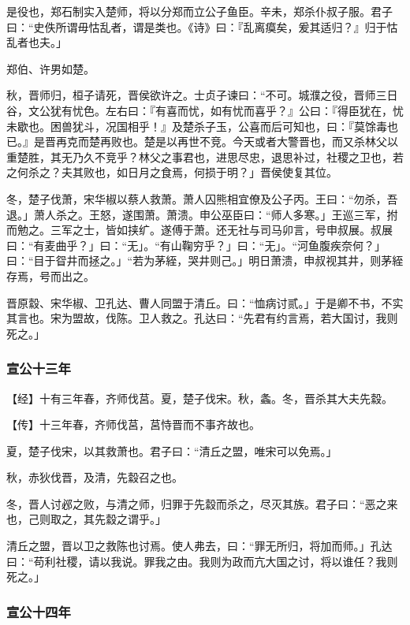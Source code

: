 \documentclass[]{article}
\begin{document}
是役也，郑石制实入楚师，将以分郑而立公子鱼臣。辛未，郑杀仆叔子服。君子曰：``史佚所谓毋怙乱者，谓是类也。《诗》曰：『乱离瘼矣，爰其适归？』归于怙乱者也夫。」

郑伯、许男如楚。

秋，晋师归，桓子请死，晋侯欲许之。士贞子谏曰：``不可。城濮之役，晋师三日谷，文公犹有忧色。左右曰：『有喜而忧，如有忧而喜乎？』公曰：『得臣犹在，忧未歇也。困兽犹斗，况国相乎！』及楚杀子玉，公喜而后可知也，曰：『莫馀毒也已。』是晋再克而楚再败也。楚是以再世不竞。今天或者大警晋也，而又杀林父以重楚胜，其无乃久不竞乎？林父之事君也，进思尽忠，退思补过，社稷之卫也，若之何杀之？夫其败也，如日月之食焉，何损于明？」晋侯使复其位。

冬，楚子伐萧，宋华椒以蔡人救萧。萧人囚熊相宜僚及公子丙。王曰：``勿杀，吾退。」萧人杀之。王怒，遂围萧。萧溃。申公巫臣曰：``师人多寒。」王巡三军，拊而勉之。三军之士，皆如挟纩。遂傅于萧。还无社与司马卯言，号申叔展。叔展曰：``有麦曲乎？」曰：``无」。``有山鞠穷乎？」曰：``无」。``河鱼腹疾奈何？」曰：``目于眢井而拯之。」``若为茅絰，哭井则己。」明日萧溃，申叔视其井，则茅絰存焉，号而出之。

晋原縠、宋华椒、卫孔达、曹人同盟于清丘。曰：``恤病讨贰。」于是卿不书，不实其言也。宋为盟故，伐陈。卫人救之。孔达曰：``先君有约言焉，若大国讨，我则死之。」

\hypertarget{header-n1448}{%
\subsubsection{宣公十三年}\label{header-n1448}}

【经】十有三年春，齐师伐莒。夏，楚子伐宋。秋，螽。冬，晋杀其大夫先縠。

【传】十三年春，齐师伐莒，莒恃晋而不事齐故也。

夏，楚子伐宋，以其救萧也。君子曰：``清丘之盟，唯宋可以免焉。」

秋，赤狄伐晋，及清，先縠召之也。

冬，晋人讨邲之败，与清之师，归罪于先縠而杀之，尽灭其族。君子曰：``恶之来也，己则取之，其先縠之谓乎。」

清丘之盟，晋以卫之救陈也讨焉。使人弗去，曰：``罪无所归，将加而师。」孔达曰：``苟利社稷，请以我说。罪我之由。我则为政而亢大国之讨，将以谁任？我则死之。」

\hypertarget{header-n1457}{%
\subsubsection{宣公十四年}\label{header-n1457}}
\end{document}
